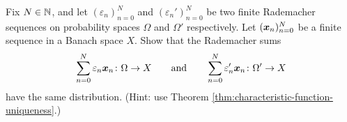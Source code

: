 \begin{exercise}\label{ex:rad-sum-dist}
  Fix $N \in \mathbb{N}$, and let $(\varepsilon_{n})_{n=0}^{N}$ and $(\varepsilon_{n}')_{n=0}^{N}$ be two finite Rademacher sequences on probability spaces $\Omega$ and $\Omega'$ respectively.
  Let $(\bm{x}_{n})_{n=0}^{N}$ be a finite sequence in a Banach space $X$.
  Show that the Rademacher sums
  \begin{equation*}
    \sum_{n = 0}^{N} \varepsilon_n \bm{x}_{n} \colon \Omega \to X \qquad \text{and} \qquad
    \sum_{n = 0}^{N} \varepsilon_n' \bm{x}_{n} \colon \Omega' \to X
  \end{equation*}
  have the same distribution.
  (Hint: use Theorem \ref{thm:characteristic-function-uniqueness}.) 
\end{exercise}


